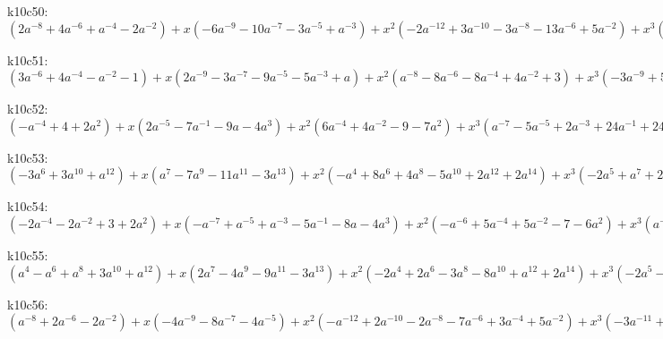 k10c50: $ (2a^{-8}+4a^{-6}+a^{-4}-2a^{-2}) +x(-6a^{-9}-10a^{-7}-3a^{-5}+a^{-3}) +x^{2}(-2a^{-12}+3a^{-10}-3a^{-8}-13a^{-6}+5a^{-2}) +x^{3}(-3a^{-11}+16a^{-9}+22a^{-7}+6a^{-5}+3a^{-3}) +x^{4}(a^{-12}-5a^{-10}+9a^{-8}+18a^{-6}-a^{-4}-4a^{-2}) +x^{5}(2a^{-11}-11a^{-9}-15a^{-7}-8a^{-5}-6a^{-3}) +x^{6}(3a^{-10}-7a^{-8}-15a^{-6}-4a^{-4}+a^{-2}) +x^{7}(4a^{-9}+3a^{-7}+a^{-5}+2a^{-3}) +x^{8}(3a^{-8}+5a^{-6}+2a^{-4}) +x^{9}(a^{-7}+a^{-5}) $

k10c51: $ (3a^{-6}+4a^{-4}-a^{-2}-1) +x(2a^{-9}-3a^{-7}-9a^{-5}-5a^{-3}+a) +x^{2}(a^{-8}-8a^{-6}-8a^{-4}+4a^{-2}+3) +x^{3}(-3a^{-9}+5a^{-7}+21a^{-5}+15a^{-3}-2a) +x^{4}(-4a^{-8}+9a^{-6}+13a^{-4}-6a^{-2}-6) +x^{5}(a^{-9}-6a^{-7}-16a^{-5}-16a^{-3}-6a^{-1}+a) +x^{6}(2a^{-8}-6a^{-6}-12a^{-4}-a^{-2}+3) +x^{7}(3a^{-7}+5a^{-5}+6a^{-3}+4a^{-1}) +x^{8}(3a^{-6}+6a^{-4}+3a^{-2}) +x^{9}(a^{-5}+a^{-3}) $

k10c52: $ (-a^{-4}+4+2a^{2}) +x(2a^{-5}-7a^{-1}-9a-4a^{3}) +x^{2}(6a^{-4}+4a^{-2}-9-7a^{2}) +x^{3}(a^{-7}-5a^{-5}+2a^{-3}+24a^{-1}+24a+8a^{3}) +x^{4}(3a^{-6}-12a^{-4}-9a^{-2}+19+13a^{2}) +x^{5}(6a^{-5}-11a^{-3}-28a^{-1}-16a-5a^{3}) +x^{6}(8a^{-4}-3a^{-2}-20-9a^{2}) +x^{7}(7a^{-3}+7a^{-1}+a+a^{3}) +x^{8}(4a^{-2}+6+2a^{2}) +x^{9}(a^{-1}+a) $

k10c53: $ (-3a^{6}+3a^{10}+a^{12}) +x(a^{7}-7a^{9}-11a^{11}-3a^{13}) +x^{2}(-a^{4}+8a^{6}+4a^{8}-5a^{10}+2a^{12}+2a^{14}) +x^{3}(-2a^{5}+a^{7}+21a^{9}+28a^{11}+10a^{13}) +x^{4}(a^{4}-9a^{6}-7a^{8}+6a^{10}-3a^{14}) +x^{5}(3a^{5}-6a^{7}-26a^{9}-27a^{11}-10a^{13}) +x^{6}(6a^{6}-13a^{10}-6a^{12}+a^{14}) +x^{7}(6a^{7}+10a^{9}+7a^{11}+3a^{13}) +x^{8}(4a^{8}+7a^{10}+3a^{12}) +x^{9}(a^{9}+a^{11}) $

k10c54: $ (-2a^{-4}-2a^{-2}+3+2a^{2}) +x(-a^{-7}+a^{-5}+a^{-3}-5a^{-1}-8a-4a^{3}) +x^{2}(-a^{-6}+5a^{-4}+5a^{-2}-7-6a^{2}) +x^{3}(a^{-7}-2a^{-5}+2a^{-3}+17a^{-1}+20a+8a^{3}) +x^{4}(2a^{-6}-6a^{-4}-3a^{-2}+17+12a^{2}) +x^{5}(3a^{-5}-7a^{-3}-18a^{-1}-13a-5a^{3}) +x^{6}(4a^{-4}-5a^{-2}-18-9a^{2}) +x^{7}(4a^{-3}+3a^{-1}+a^{3}) +x^{8}(3a^{-2}+5+2a^{2}) +x^{9}(a^{-1}+a) $

k10c55: $ (a^{4}-a^{6}+a^{8}+3a^{10}+a^{12}) +x(2a^{7}-4a^{9}-9a^{11}-3a^{13}) +x^{2}(-2a^{4}+2a^{6}-3a^{8}-8a^{10}+a^{12}+2a^{14}) +x^{3}(-2a^{5}-2a^{7}+15a^{9}+24a^{11}+9a^{13}) +x^{4}(a^{4}-3a^{6}+5a^{8}+13a^{10}+a^{12}-3a^{14}) +x^{5}(2a^{5}-a^{7}-16a^{9}-23a^{11}-10a^{13}) +x^{6}(3a^{6}-4a^{8}-15a^{10}-7a^{12}+a^{14}) +x^{7}(3a^{7}+5a^{9}+5a^{11}+3a^{13}) +x^{8}(3a^{8}+6a^{10}+3a^{12}) +x^{9}(a^{9}+a^{11}) $

k10c56: $ (a^{-8}+2a^{-6}-2a^{-2}) +x(-4a^{-9}-8a^{-7}-4a^{-5}) +x^{2}(-a^{-12}+2a^{-10}-2a^{-8}-7a^{-6}+3a^{-4}+5a^{-2}) +x^{3}(-3a^{-11}+11a^{-9}+21a^{-7}+11a^{-5}+4a^{-3}) +x^{4}(a^{-12}-6a^{-10}+4a^{-8}+12a^{-6}-3a^{-4}-4a^{-2}) +x^{5}(3a^{-11}-11a^{-9}-21a^{-7}-13a^{-5}-6a^{-3}) +x^{6}(5a^{-10}-5a^{-8}-14a^{-6}-3a^{-4}+a^{-2}) +x^{7}(6a^{-9}+7a^{-7}+3a^{-5}+2a^{-3}) +x^{8}(4a^{-8}+6a^{-6}+2a^{-4}) +x^{9}(a^{-7}+a^{-5}) $

